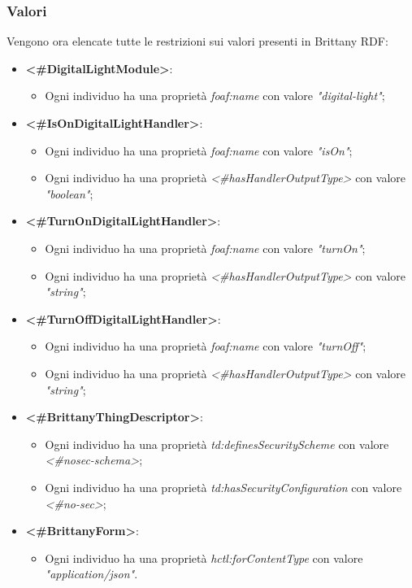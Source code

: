 \subsubsection{Valori}
Vengono ora elencate tutte le restrizioni sui valori presenti in Brittany RDF:
\begin{itemize}
	\item \textbf{<\#DigitalLightModule>}:
	\begin{itemize}
		\item Ogni individuo ha una proprietà \textit{foaf:name} con valore \textit{"digital-light"};
	\end{itemize}
	\item \textbf{<\#IsOnDigitalLightHandler>}:
		\begin{itemize}
		\item Ogni individuo ha una proprietà \textit{foaf:name} con valore \textit{"isOn"};
		\item Ogni individuo ha una proprietà \textit{<\#hasHandlerOutputType>} con valore \textit{"boolean"};
	\end{itemize}
	\item \textbf{<\#TurnOnDigitalLightHandler>}:
	\begin{itemize}
		\item Ogni individuo ha una proprietà \textit{foaf:name} con valore \textit{"turnOn"};
		\item Ogni individuo ha una proprietà \textit{<\#hasHandlerOutputType>} con valore \textit{"string"};
	\end{itemize}
	\item \textbf{<\#TurnOffDigitalLightHandler>}:
	\begin{itemize}
		\item Ogni individuo ha una proprietà \textit{foaf:name} con valore \textit{"turnOff"};
		\item Ogni individuo ha una proprietà \textit{<\#hasHandlerOutputType>} con valore \textit{"string"};
	\end{itemize}
	\item \textbf{<\#BrittanyThingDescriptor>}:
	\begin{itemize}
		\item Ogni individuo ha una proprietà \textit{td:definesSecurityScheme} con valore \textit{<\#nosec-schema>};
		\item Ogni individuo ha una proprietà \textit{td:hasSecurityConfiguration} con valore \textit{<\#no-sec>};
	\end{itemize}
	\item \textbf{<\#BrittanyForm>}:
	\begin{itemize}
		\item Ogni individuo ha una proprietà \textit{hctl:forContentType} con valore \textit{"application/json"}.
	\end{itemize}
\end{itemize}
